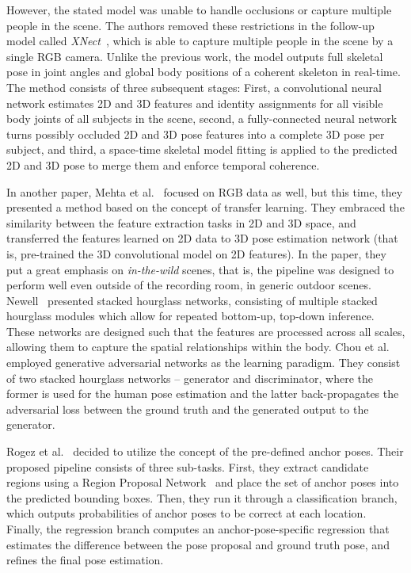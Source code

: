 \noindent However, the stated model was unable to handle occlusions or capture multiple people in the scene. The authors removed these restrictions in the follow-up model called \textit{XNect}~\cite{DBLP:journals/corr/abs-1907-00837}, which is able to capture multiple people in the scene by a single RGB camera. Unlike the previous work, the model outputs full skeletal pose in joint angles and global body positions of a coherent skeleton in real-time. The method consists of three subsequent stages: First, a convolutional neural network estimates 2D and 3D features and identity assignments for all visible body joints of all subjects in the scene, second, a fully-connected neural network turns possibly occluded 2D and 3D pose features into a complete 3D pose per subject, and third, a space-time skeletal model fitting is applied to the predicted 2D and 3D pose to merge them and enforce temporal coherence.\par
\vspace{5mm}
\noindent
In another paper, Mehta et al.~\cite{mono-3dhp2017} focused on RGB data as well, but this time, they presented a method based on the concept of transfer learning. They embraced the similarity between the feature extraction tasks in 2D and 3D space, and transferred the features learned on 2D data to 3D pose estimation network (that is, pre-trained the 3D convolutional model on 2D features). In the paper, they put a great emphasis on \textit{in-the-wild} scenes, that is, the pipeline was designed to perform well even outside of the recording room, in generic outdoor scenes. Newell~\cite{DBLP:journals/corr/NewellYD16} presented stacked hourglass networks, consisting of multiple stacked hourglass modules which allow for repeated bottom-up, top-down inference. These networks are designed such that the features are processed across all scales, allowing them to capture the spatial relationships within the body. Chou et al.~\cite{DBLP:journals/corr/ChouCC17} employed generative adversarial networks as the learning paradigm. They consist of two stacked hourglass networks – generator and discriminator, where the former is used for the human pose estimation and the latter back-propagates the adversarial loss between the ground truth and the generated output to the generator. \par
\vspace{5mm}
\noindent
Rogez et al.~\cite{lcrnet} decided to utilize the concept of the pre-defined anchor poses. Their proposed pipeline consists of three sub-tasks. First, they extract candidate regions using a Region Proposal Network~\cite{NIPS2015_5638} and place the set of anchor poses into the predicted bounding boxes. Then, they run it through a classification branch, which outputs probabilities of anchor poses to be correct at each location. Finally, the regression branch computes an anchor-pose-specific regression that estimates the difference between the pose proposal and ground truth pose, and refines the final pose estimation. 

